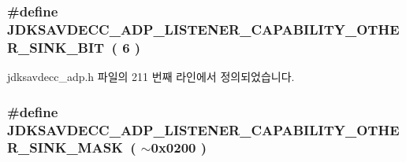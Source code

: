 \subsubsection[{\texorpdfstring{J\+D\+K\+S\+A\+V\+D\+E\+C\+C\+\_\+\+A\+D\+P\+\_\+\+L\+I\+S\+T\+E\+N\+E\+R\+\_\+\+C\+A\+P\+A\+B\+I\+L\+I\+T\+Y\+\_\+\+O\+T\+H\+E\+R\+\_\+\+S\+I\+N\+K\+\_\+\+B\+IT}{JDKSAVDECC_ADP_LISTENER_CAPABILITY_OTHER_SINK_BIT}}]{\setlength{\rightskip}{0pt plus 5cm}\#define J\+D\+K\+S\+A\+V\+D\+E\+C\+C\+\_\+\+A\+D\+P\+\_\+\+L\+I\+S\+T\+E\+N\+E\+R\+\_\+\+C\+A\+P\+A\+B\+I\+L\+I\+T\+Y\+\_\+\+O\+T\+H\+E\+R\+\_\+\+S\+I\+N\+K\+\_\+\+B\+IT~( 6 )}\hypertarget{group__adp__listener__capability_ga2b79303b3832bed76ba90fa8c84e0bd3}{}\label{group__adp__listener__capability_ga2b79303b3832bed76ba90fa8c84e0bd3}


jdksavdecc\+\_\+adp.\+h 파일의 211 번째 라인에서 정의되었습니다.

\subsubsection[{\texorpdfstring{J\+D\+K\+S\+A\+V\+D\+E\+C\+C\+\_\+\+A\+D\+P\+\_\+\+L\+I\+S\+T\+E\+N\+E\+R\+\_\+\+C\+A\+P\+A\+B\+I\+L\+I\+T\+Y\+\_\+\+O\+T\+H\+E\+R\+\_\+\+S\+I\+N\+K\+\_\+\+M\+A\+SK}{JDKSAVDECC_ADP_LISTENER_CAPABILITY_OTHER_SINK_MASK}}]{\setlength{\rightskip}{0pt plus 5cm}\#define J\+D\+K\+S\+A\+V\+D\+E\+C\+C\+\_\+\+A\+D\+P\+\_\+\+L\+I\+S\+T\+E\+N\+E\+R\+\_\+\+C\+A\+P\+A\+B\+I\+L\+I\+T\+Y\+\_\+\+O\+T\+H\+E\+R\+\_\+\+S\+I\+N\+K\+\_\+\+M\+A\+SK~( $\sim$0x0200 )}\hypertarget{group__adp__listener__capability_gab96a1d20c03244625a0ae31900720897}{}\label{group__adp__listener__capability_gab96a1d20c03244625a0ae31900720897}


